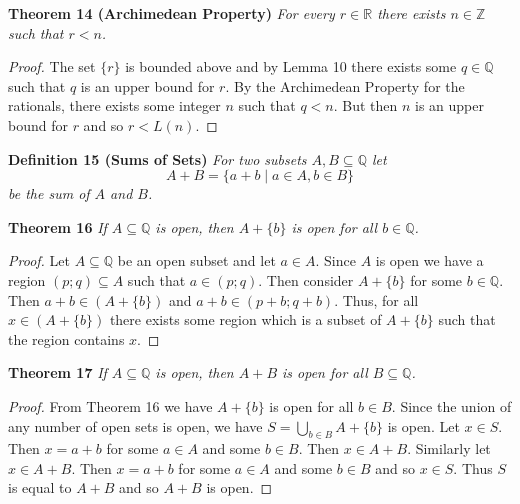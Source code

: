 \documentclass{article}
\begin{document}
\begin{flushleft}
\textbf{Theorem 14 (Archimedean Property)}
\textsl{For every $r \in \mathbb{R}$ there exists $n \in \mathbb{Z}$ such that $r<n$.}
\begin{proof}
The set $\{r\}$ is bounded above and by Lemma 10 there exists some $q \in \mathbb{Q}$ such that $q$ is an upper bound for $r$. By the Archimedean Property for the rationals, there exists some integer $n$ such that $q<n$. But then $n$ is an upper bound for $r$ and so $r < L(n)$.
\end{proof}

\textbf{Definition 15 (Sums of Sets)}
\textsl{For two subsets $A, B \subseteq \mathbb{Q}$ let
\[
A+B = \{a+b \mid a \in A , b \in B\}
\]
be the sum of $A$ and $B$.}
\newline

\textbf{Theorem 16}
\textsl{If $A \subseteq \mathbb{Q}$ is open, then $A + \{b\}$ is open for all $b \in \mathbb{Q}$.}
\begin{proof}
Let $A \subseteq \mathbb{Q}$ be an open subset and let $a \in A$. Since $A$ is open we have a region $(p;q) \subseteq A$ such that $a \in (p;q)$. Then consider $A+\{b\}$ for some $b \in \mathbb{Q}$. Then $a+b \in (A + \{b\})$ and $a+b \in (p+b;q+b)$. Thus, for all $x \in (A + \{b\})$ there exists some region which is a subset of $A + \{b\}$ such that the region contains $x$.
\end{proof}

\textbf{Theorem 17}
\textsl{If $A \subseteq \mathbb{Q}$ is open, then $A+B$ is open for all $B \subseteq \mathbb{Q}$.}
\begin{proof}
From Theorem 16 we have $A + \{b\}$ is open for all $b \in B$. Since the union of any number of open sets is open, we have $S=\bigcup_{b \in B} A + \{b\}$ is open. Let $x \in S$. Then $x=a+b$ for some $a \in A$ and some $b \in B$. Then $x \in A+B$. Similarly let $x \in A+B$. Then $x=a+b$ for some $a \in A$ and some $b \in B$ and so $x \in S$. Thus $S$ is equal to $A + B$ and so $A + B$ is open.
\end{proof}


\end{flushleft}
\end{document}
